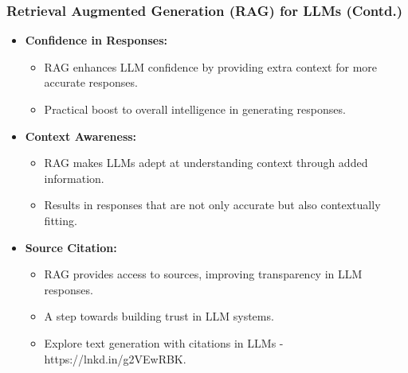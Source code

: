 \begin{frame}[fragile]\frametitle{Retrieval Augmented Generation (RAG) for LLMs (Contd.)}

\begin{itemize}
  \item \textbf{Confidence in Responses:}
    \begin{itemize}
      \item RAG enhances LLM confidence by providing extra context for more accurate responses.
      \item Practical boost to overall intelligence in generating responses.
    \end{itemize}
  
  \item \textbf{Context Awareness:}
    \begin{itemize}
      \item RAG makes LLMs adept at understanding context through added information.
      \item Results in responses that are not only accurate but also contextually fitting.
    \end{itemize}

  \item \textbf{Source Citation:}
    \begin{itemize}
      \item RAG provides access to sources, improving transparency in LLM responses.
      \item A step towards building trust in LLM systems.
      \item Explore text generation with citations in LLMs - https://lnkd.in/g2VEwRBK.
    \end{itemize}
\end{itemize}

\end{frame}


